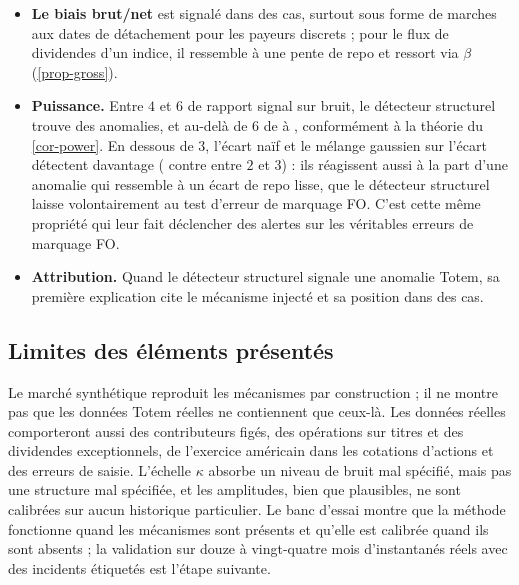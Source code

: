 \begin{itemize}
aberrante sur \vFoNaive{} et \vFoGmmDiff{} d'entre elles. Le test d'erreur de marquage FO trouve \vFoMismarkEuStock{} des
erreurs sur les actions européennes et \vFoMismarkIndex{} sur l'indice, mais seulement \vFoMismarkHtb{} sur les titres
difficiles à emprunter : les vues de repo des contributeurs y diffèrent d'environ $60$\,pb, si bien qu'un écart FO de
$15$ à $50$\,pb reste dans l'incertitude du consensus lui-même.
\item \textbf{Le biais brut/net} est signalé dans \vGrossStruct{} des cas, surtout sous forme de marches aux dates de
détachement pour les payeurs discrets ; pour le flux de dividendes d'un indice, il ressemble à une pente de repo et
ressort via $\beta$ (\cref{prop-gross}).
\item \textbf{Puissance.} Entre $4$ et $6$ de rapport signal sur bruit, le détecteur structurel trouve \vPowStructE{} des
anomalies, et au-delà de $6$ de \vPowStructF{} à \vPowStructH, conformément à la théorie du \cref{cor-power}. En dessous de
$3$, l'écart naïf et le mélange gaussien sur l'écart détectent davantage (\vPowGmmDiffC{} contre \vPowStructC{} entre $2$
et $3$) : ils réagissent aussi à la part d'une anomalie qui ressemble à un écart de repo lisse, que le détecteur
structurel laisse volontairement au test d'erreur de marquage FO. C'est cette même propriété qui leur fait déclencher des
alertes sur les véritables erreurs de marquage FO.
\item \textbf{Attribution.} Quand le détecteur structurel signale une anomalie Totem, sa première explication cite le
mécanisme injecté et sa position dans \vAttr{} des cas.
\end{itemize}

\subsection{Limites des éléments présentés}
\begin{caveat}
Le marché synthétique reproduit les mécanismes par construction ; il ne montre pas que les données Totem réelles ne
contiennent que ceux-là. Les données réelles comporteront aussi des contributeurs figés, des opérations sur titres et des
dividendes exceptionnels, de l'exercice américain dans les cotations d'actions et des erreurs de saisie. L'échelle $\kappa$
absorbe un niveau de bruit mal spécifié, mais pas une structure mal spécifiée, et les amplitudes, bien que plausibles, ne
sont calibrées sur aucun historique particulier. Le banc d'essai montre que la méthode fonctionne quand les mécanismes sont
présents et qu'elle est calibrée quand ils sont absents ; la validation sur douze à vingt-quatre mois d'instantanés réels
avec des incidents étiquetés est l'étape suivante.
\end{caveat}
